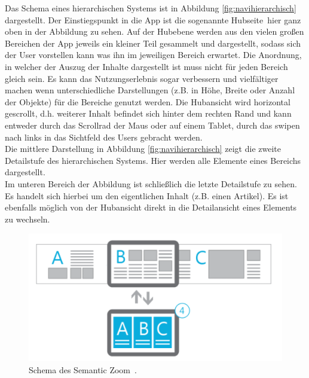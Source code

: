 \documentclass[12pt,a4paper,bibtotoc,abstracton]{scrartcl}
\begin{document}
Das Schema eines hierarchischen Systems ist in Abbildung \ref{fig:navihierarchisch} dargestellt. Der Einstiegspunkt in die App ist die sogenannte \glqq Hubseite\grqq\, hier ganz oben in der Abbildung zu sehen. Auf der Hubebene werden aus den vielen großen Bereichen der App jeweils ein kleiner Teil gesammelt und dargestellt, sodass sich der User vorstellen kann was ihn im jeweiligen Bereich erwartet. Die Anordnung, in welcher der Auszug der Inhalte dargestellt ist muss nicht für jeden Bereich gleich sein. Es kann das Nutzungserlebnis sogar verbessern und vielfältiger machen wenn unterschiedliche Darstellungen (z.B. in Höhe, Breite oder Anzahl der Objekte) für die Bereiche genutzt werden. Die Hubansicht wird horizontal gescrollt, d.h. weiterer Inhalt befindet sich hinter dem rechten Rand und kann entweder durch das Scrollrad der Maus oder auf einem Tablet, durch das swipen nach links in das Sichtfeld des Users gebracht werden.\\
Die mittlere Darstellung in Abbildung \ref{fig:navihierarchisch} zeigt die zweite Detailstufe des hierarchischen Systems. Hier werden alle Elemente eines Bereichs dargestellt.\\
Im unteren Bereich der Abbildung ist schließlich die letzte Detailstufe zu sehen. Es handelt sich hierbei um den eigentlichen Inhalt (z.B. einen Artikel). Es ist ebenfalls möglich von der Hubansicht direkt in die Detailansicht eines Elements zu wechseln.  

\begin{figure}[h]	
	\centering
	\includegraphics[scale=1]{Bilder/Abbildungen/ms_navigation_hierarchie_semantic_zoom} 
	\caption{Schema des \glqq Semantic Zoom\grqq\ \protect\citep{MicrosoftNavidesign2013}.}
	\label{fig:semanticzoomkonzept}
\end{figure}
\end{document}
